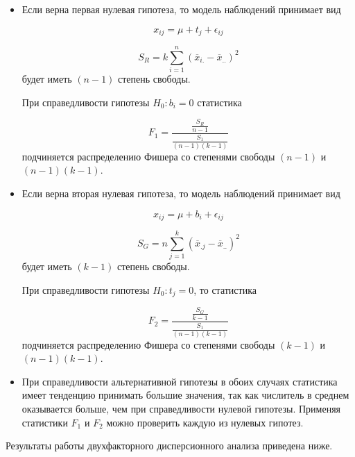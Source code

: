 \begin{itemize}
	\item Если верна первая нулевая гипотеза, то модель наблюдений принимает вид
	
	\begin{equation}
		x_{ij} = \mu + t_j + \epsilon_{ij}
	\end{equation}
	
	\begin{equation*}
		S_R = k \sum\limits_{i=1}^n \left(\overline{x}_{i.} - \overline{x}_{..}\right)^2
	\end{equation*}
	будет иметь $(n - 1)$ степень свободы.
	
	При справедливости гипотезы $H_0: b_i = 0$ статистика
	
	\begin{equation}
		F_1 = \frac{\frac{S_R}{n - 1}}{\frac{S_1}{(n - 1)(k - 1)}}
	\end{equation}
	подчиняется распределению Фишера со степенями свободы $(n - 1)$ и $(n - 1)(k - 1)$.
	
	\item Если верна вторая нулевая гипотеза, то модель наблюдений принимает вид
	
	\begin{equation}
		x_{ij} = \mu + b_i + \epsilon_{ij}
	\end{equation}
	
	\begin{equation*}
		S_G = n \sum\limits_{j=1}^k \left(\overline{x}_{.j} - \overline{x}_{..}\right)^2
	\end{equation*}
	будет иметь $(k - 1)$ степень свободы.
	
	При справедливости гипотезы $H_0: t_j = 0$, то статистика
	
	\begin{equation}
		F_2 = \frac{\frac{S_G}{k - 1}}{\frac{S_1}{(n - 1)(k - 1)}}
	\end{equation}
	подчиняется распределению Фишера со степенями свободы $(k - 1)$ и $(n - 1)(k - 1)$.
	
	\item При справедливости альтернативной гипотезы в обоих случаях статистика имеет тенденцию принимать большие значения, так как числитель в среднем оказывается больше, чем при справедливости нулевой гипотезы. Применяя статистики $F_1$ и $F_2$ можно проверить каждую из нулевых гипотез.
\end{itemize}

Результаты работы двухфакторного дисперсионного анализа приведена ниже.

